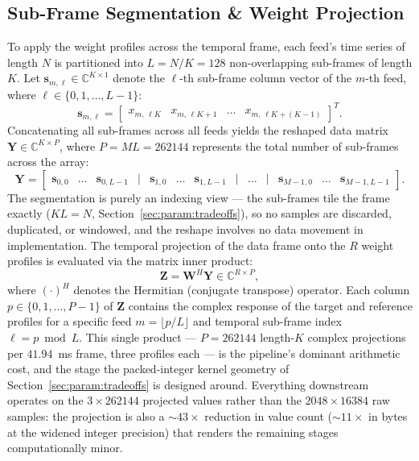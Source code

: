 \subsection{Sub-Frame Segmentation \& Weight Projection}
\label{sec:pipeline:segmentation}

To apply the weight profiles across the temporal frame, each feed's time series of length $N$ is partitioned into $L = N / K = 128$ non-overlapping sub-frames of length $K$. Let $\mathbf{s}_{m,\ell} \in \mathbb{C}^{K \times 1}$ denote the $\ell$-th sub-frame column vector of the $m$-th feed, where $\ell \in \{0, 1, \dots, L-1\}$:
\begin{equation}
\mathbf{s}_{m,\ell} = \begin{bmatrix}
x_{m, \, \ell K} & x_{m, \, \ell K + 1} & \dots & x_{m, \, \ell K + (K-1)}
\end{bmatrix}^T.
\end{equation}
Concatenating all sub-frames across all feeds yields the reshaped data matrix $\mathbf{Y} \in \mathbb{C}^{K \times P}$, where $P = M L = 262144$ represents the total number of sub-frames across the array:
\begin{equation}
\mathbf{Y} = \begin{bmatrix}
\mathbf{s}_{0,0} & \dots & \mathbf{s}_{0, L-1} & \big| & \mathbf{s}_{1,0} & \dots & \mathbf{s}_{1, L-1} & \big| & \dots & \big| & \mathbf{s}_{M-1,0} & \dots & \mathbf{s}_{M-1, L-1}
\end{bmatrix}.
\end{equation}
The segmentation is purely an indexing view --- the sub-frames tile the frame exactly ($KL = N$, Section~\ref{sec:param:tradeoffs}), so no samples are discarded, duplicated, or windowed, and the reshape involves no data movement in implementation. The temporal projection of the data frame onto the $R$ weight profiles is evaluated via the matrix inner product:
\begin{equation}
\mathbf{Z} = \mathbf{W}^H \mathbf{Y} \in \mathbb{C}^{R \times P},
\end{equation}
where $(\cdot)^H$ denotes the Hermitian (conjugate transpose) operator. Each column $p \in \{0, 1, \dots, P-1\}$ of $\mathbf{Z}$ contains the complex response of the target and reference profiles for a specific feed $m = \lfloor p / L \rfloor$ and temporal sub-frame index $\ell = p \bmod L$. This single product --- $P = 262144$ length-$K$ complex projections per $41.94$~ms frame, three profiles each --- is the pipeline's dominant arithmetic cost, and the stage the packed-integer kernel geometry of Section~\ref{sec:param:tradeoffs} is designed around. Everything downstream operates on the $3 \times 262144$ projected values rather than the $2048 \times 16384$ raw samples: the projection is also a ${\sim}43\times$ reduction in value count (${\sim}11\times$ in bytes at the widened integer precision) that renders the remaining stages computationally minor.

